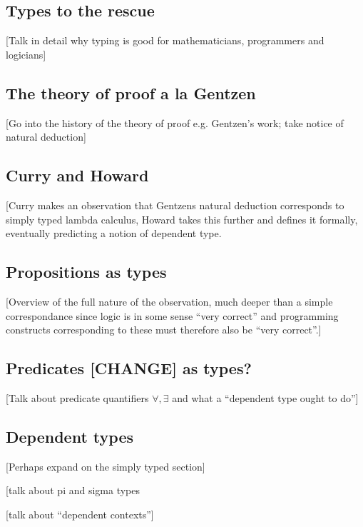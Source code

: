 \subsection{Types to the rescue}

[Talk in detail why typing is good for mathematicians, programmers and logicians]

\subsection{The theory of proof a la Gentzen}

[Go into the history of the theory of proof e.g. Gentzen's work; take notice of natural deduction]

\subsection{Curry and Howard}

[Curry makes an observation that Gentzens natural deduction corresponds to simply typed lambda calculus, Howard takes this further and defines it formally, eventually predicting a notion of dependent type.

\subsection{Propositions as types}

[Overview of the full nature of the observation, much deeper than a simple correspondance since logic is in some sense ``very correct'' and programming constructs corresponding to these must therefore also be ``very correct''.]

\subsection{Predicates [CHANGE] as types?}

[Talk about predicate quantifiers $\forall, \exists$ and what a ``dependent type ought to do'']


\subsection{Dependent types}

[Perhaps expand on the simply typed section]

[talk about pi and sigma types

[talk about ``dependent contexts'']


